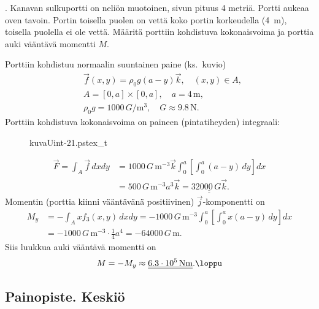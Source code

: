 \begin{Exa} . 
Kanavan sulkuportti on neliön muotoinen, sivun pituus 4 metriä. Portti aukeaa oven tavoin. 
Portin toisella puolen on vettä koko portin korkeudella (4\, m), toisella puolella ei ole
vettä. Määritä porttiin kohdistuva kokonaisvoima ja porttia auki vääntävä momentti $M$.
\end{Exa}
\begin{multicols}{2} \raggedcolumns
\ratk
Porttiin kohdistuu normaalin suuntainen paine (ks.\ kuvio)
\begin{align*}
&\vec f(x,y)=\rho_0g(a-y)\vec k, \quad (x,y)\in A, \\
&A=[0,a]\times [0,a], \quad a=4\,\text{m}, \\
&\rho_0g=1000\,G/\text{m}^3, \quad G \approx 9.8\,\text{N}.
\end{align*}
Porttiin kohdistuva kokonaisvoima on paineen (pintatiheyden) integraali:
\begin{figure}[H]
\begin{center}
{kuvaUint-21.pstex_t}
\end{center}
\end{figure}
\end{multicols}
\begin{align*}
\vec F=\int_A\vec f\, dxdy 
&= 1000\,G\,\text{m}^{-3}\vec k\int_0^a\left[\int_0^a (a-y)\,dy\right]dx \\
&=500\,G\,\text{m}^{-3}a^3\vec k=\underline{\underline{32000\,G\vec k}}.
\end{align*}
Momentin (porttia kiinni vääntävänä positiivinen) $\vec j$-komponentti on
\begin{align*}
M_y &= -\int_A xf_3(x,y)\,dxdy 
     = -1000\,G\,\text{m}^{-3}\int_0^a\left[\int_0^a x(a-y)\,dy\right]dx \\
    &=-1000\,G\,\text{m}^{-3}\cdot\frac{1}{4}a^4=-64000\,G\,\text{m}.
\end{align*}
Siis luukkua auki vääntävä momentti on  
\[
M = -M_y \approx \underline{\underline{6.3\cdot 10^5\,\text{Nm}}}. \loppu
\]

\subsection{Painopiste. Keskiö}

